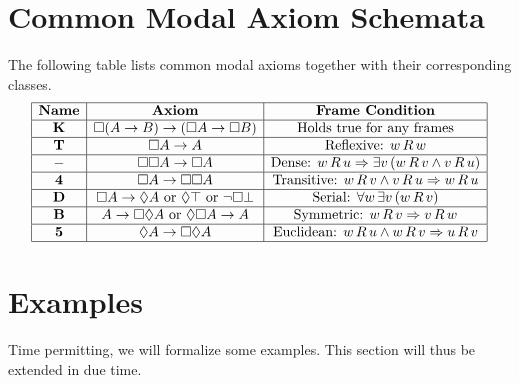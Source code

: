 \section*{Common Modal Axiom Schemata}

The following table lists common modal axioms together with their corresponding classes.
\[
\begin{array}{|c|c|c|}
\hline
\textbf{Name} & \textbf{Axiom} & \textbf{Frame Condition} \\
\hline
\textbf{K} & \Box (A \to B) \to (\Box A \to \Box B) & \text{Holds true for any frames} \\
\hline
\textbf{T} & \Box A \to A & \text{Reflexive: } w\,R\,w \\
\hline
- & \Box\Box A \to \Box A & \text{Dense: } w\,R\,u \Rightarrow \exists v\,(w\,R\,v \land v\,R\,u) \\
\hline
\textbf{4} & \Box A \to \Box\Box A & \text{Transitive: } w\,R\,v \wedge v\,R\,u \Rightarrow w\,R\,u \\
\hline
\textbf{D} & \Box A \to \Diamond A \text{ or } \Diamond\top \text{ or } \neg\Box\bot & \text{Serial: } \forall w\,\exists v\,(w\,R\,v) \\
\hline
\textbf{B} & A \to \Box\Diamond A \text{ or } \Diamond\Box A \to A & \text{Symmetric: } w\,R\,v \Rightarrow v\,R\,w \\
\hline
\textbf{5} & \Diamond A \to \Box\Diamond A & \text{Euclidean: } w\,R\,u \land w\,R\,v \Rightarrow u\,R\,v \\
\hline
\end{array}
\]

\section*{Examples}
Time permitting, we will formalize some examples. This section will thus be extended in due time.


 
  

